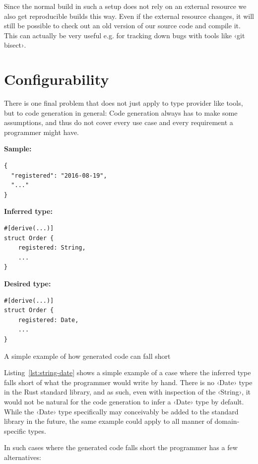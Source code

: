 Since the normal build in such a setup does not rely on an external resource we also get reproducible builds this way. Even if the external resource changes, it will still be possible to check out an old version of our source code and compile it. This can actually be very useful e.g. for tracking down bugs with tools like ‹git bisect›.

\section{Configurability}

There is one final problem that does not just apply to type provider like tools, but to code generation in general: Code generation always has to make some assumptions, and thus do not cover every use case and every requirement a programmer might have.

\begin{listing}[ht!]
\textbf{Sample:}
\begin{verbatim}
{
  "registered": "2016-08-19",
  "..."
}
\end{verbatim}
\vspace{5mm}

\textbf{Inferred type:}
\begin{verbatim}
#[derive(...)]
struct Order {
    registered: String,
    ...
}
\end{verbatim}
\vspace{5mm}

\textbf{Desired type:}
\begin{verbatim}
#[derive(...)]
struct Order {
    registered: Date,
    ...
}
\end{verbatim}
\caption{A simple example of how generated code can fall short}
\label{lst:string-date}
\end{listing}

Listing~\ref{lst:string-date} shows a simple example of a case where the inferred type falls short of what the programmer would write by hand. There is no ‹Date› type in the Rust standard library, and as such, even with inspection of the ‹String›, it would not be natural for the code generation to infer a ‹Date› type by default. While the ‹Date› type specifically may conceivably be added to the standard library in the future, the same example could apply to all manner of domain-specific types.

In such cases where the generated code falls short the programmer has a few alternatives:


